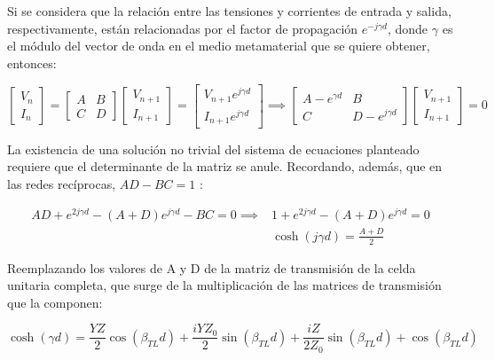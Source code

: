 Si se considera que la relación entre las tensiones y corrientes de entrada y salida, respectivamente, están relacionadas por el factor de propagación $e^{-j\gamma d}$, donde $\gamma$ es el módulo del vector de onda en el medio metamaterial que se quiere obtener, entonces:

\begin{equation}
	\begin{bmatrix}
		V_n \\ I_n
	\end{bmatrix}
	=
	\begin{bmatrix}
	A & B \\
	C & D
	\end{bmatrix}
	\begin{bmatrix}
	V_{n+1} \\
	I_{n+1}
	\end{bmatrix}
	=
	\begin{bmatrix}
	V_{n+1}e^{j\gamma d} \\ 
	I_{n+1}e^{j\gamma d}
	\end{bmatrix}
	\implies
	\begin{bmatrix}
	A-e^{\gamma d} & B \\
	C & D-e^{j\gamma d}
	\end{bmatrix}
	\begin{bmatrix}
	V_{n+1} \\ I_{n+1}
	\end{bmatrix}
	= 0
\end{equation}

La existencia de una solución no trivial del sistema de ecuaciones planteado requiere que el determinante de la matriz se anule. Recordando, además, que en las redes recíprocas, $AD-BC=1$ \cite{Pozar:MwEngineering}:

\begin{subequations}
	\begin{align}
		AD + e^{2j \gamma d} - (A+D)e^{j\gamma d}-BC = 0 \implies &1+e^{2j\gamma d}-(A+D)e^{j\gamma d} = 0 \\
		&\cosh (j\gamma d) = \frac{A+D}{2}
	\end{align}
\end{subequations}

Reemplazando los valores de A y D de la matriz de transmisión de la celda unitaria completa, que surge de la multiplicación de las matrices de transmisión que la componen:

\begin{equation}
\cosh (\gamma d) = \frac{Y Z}{2} \cos{\left (\beta_{TL} d \right )} + \frac{i Y Z_{0}}{2} \sin{\left (\beta_{TL} d \right )} + \frac{i Z}{2 Z_{0}} \sin{\left (\beta_{TL} d \right )} + \cos{\left (\beta_{TL} d \right )}
\end{equation}

